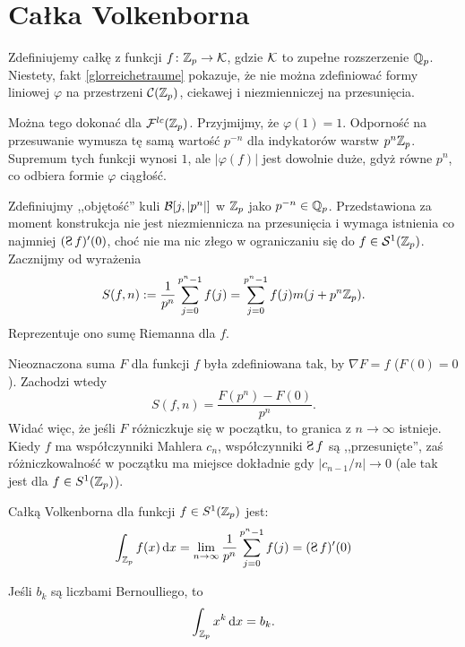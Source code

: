 \section{Całka Volkenborna}
Zdefiniujemy  całkę z funkcji $f \colon \mathbb Z_p \to \mathcal K$, gdzie $\mathcal K$ to zupełne rozszerzenie $\mathbb Q_p$.
Niestety, fakt \ref{glorreichetraume} pokazuje, że nie można zdefiniować formy liniowej $\varphi$ na przestrzeni $\mathcal C(\mathbb Z_p)$, ciekawej i  niezmienniczej na przesunięcia. %

Można tego dokonać dla $\mathcal F^{lc}(\mathbb Z_p)$.
Przyjmijmy, że $\varphi(1) = 1$.
Odporność na przesuwanie wymusza tę samą wartość $p^{-n}$ dla indykatorów warstw $p^n \mathbb Z_p$.
Supremum tych funkcji wynosi $1$, ale $|\varphi(f)|$ jest dowolnie duże, gdyż równe $p^n$, co odbiera formie $\varphi$ ciągłość.

Zdefiniujmy ,,objętość'' kuli $\mathcal B[j, |p^n|]$ w $\mathbb Z_p$ jako $p^{-n} \in \mathbb Q_p$.
Przedstawiona za moment konstrukcja nie jest niezmiennicza na przesunięcia i wymaga istnienia co najmniej $(\suma f)'(0)$, choć nie ma nic złego w ograniczaniu się do $f \in \mathcal S^1(\mathbb Z_p)$.
Zacznijmy od wyrażenia
\[
	S(f, n) := \frac{1}{p^n}\sum_{j=0}^{p^n-1} f(j) = \sum_{j=0}^{p^n-1} f(j) m(j+p^n\mathbb Z_p).
\]
Reprezentuje ono sumę Riemanna dla $f$.

Nieoznaczona suma $F$ dla funkcji $f$ była zdefiniowana tak, by $\nabla F = f$ ($F(0) = 0$).
Zachodzi wtedy
\[
	S(f, n) = \frac{F(p^n) - F(0)}{p^n}.
\]
Widać więc, że jeśli $F$ różniczkuje się w początku, to granica z $n \to \infty$ istnieje.
Kiedy $f$ ma współczynniki Mahlera $c_n$, współczynniki $\suma f$ są ,,przesunięte'', zaś różniczkowalność w początku ma miejsce dokładnie gdy $|c_{n-1}/n| \to 0$ (ale tak jest dla $f \in S^1(\mathbb Z_p)$). %

\begin{definicja}
{Całką Volkenborna} dla funkcji $f \in S^1(\mathbb Z_p)$ jest:
\[
	\int_{\Z_p} f(x) \,\textrm{d}x = \lim_{n\to \infty} \frac{1}{p^n} \sum_{j=0}^{p^n-1} f(j) = (\suma f)'(0)
\]
\end{definicja}

\begin{przyklad}
	Jeśli $b_k$ są liczbami Bernoulliego, to %
	\[
		\int_{\mathbb Z_p} x^k \,\textrm{d}x = b_k.
	\]
\end{przyklad}

